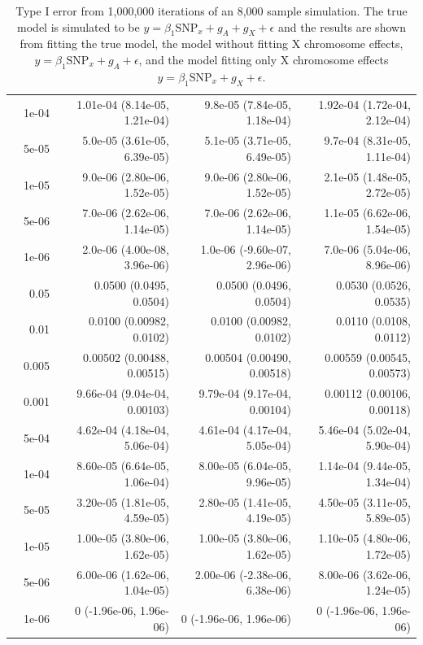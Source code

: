 \documentclass[11pt]{article} %
\newcommand{\snpX}{\mbox{SNP}_x}
\begin{document}
\begin{table}[ht]
\begin{tabular}{rrrrr}
   & 1e-04 & 1.01e-04 (8.14e-05, 1.21e-04) & 9.8e-05 (7.84e-05, 1.18e-04) & 1.92e-04 (1.72e-04, 2.12e-04) \\ 
 & 5e-05 & 5.0e-05 (3.61e-05, 6.39e-05) & 5.1e-05 (3.71e-05, 6.49e-05) & 9.7e-04 (8.31e-05, 1.11e-04) \\ 
& 1e-05 & 9.0e-06 (2.80e-06, 1.52e-05) & 9.0e-06 (2.80e-06, 1.52e-05) & 2.1e-05 (1.48e-05, 2.72e-05) \\ 
 & 5e-06 & 7.0e-06 (2.62e-06, 1.14e-05) & 7.0e-06 (2.62e-06, 1.14e-05) & 1.1e-05  (6.62e-06, 1.54e-05) \\ 
  &  1e-06 & 2.0e-06 (4.00e-08, 3.96e-06) & 1.0e-06 (-9.60e-07, 2.96e-06) & 7.0e-06  (5.04e-06, 8.96e-06) \\ 
   \hline \hline
\parbox[t]{2mm}{}  & 0.05 & 0.0500 (0.0495, 0.0504) & 0.0500 (0.0496, 0.0504) & 0.0530 (0.0526, 0.0535) \\ 
 & 0.01 & 0.0100  (0.00982, 0.0102) & 0.0100 (0.00982, 0.0102) & 0.0110 (0.0108, 0.0112) \\ 
 & 0.005 & 0.00502  (0.00488, 0.00515) & 0.00504 (0.00490, 0.00518) & 0.00559 (0.00545, 0.00573) \\ 
 & 0.001 & 9.66e-04  (9.04e-04, 0.00103) & 9.79e-04 (9.17e-04, 0.00104) & 0.00112 (0.00106, 0.00118) \\ 
 & 5e-04 & 4.62e-04  (4.18e-04, 5.06e-04) & 4.61e-04  (4.17e-04, 5.05e-04) & 5.46e-04  (5.02e-04, 5.90e-04) \\ 
 & 1e-04 & 8.60e-05  (6.64e-05, 1.06e-04) & 8.00e-05  (6.04e-05, 9.96e-05) & 1.14e-04  (9.44e-05, 1.34e-04) \\ 
 & 5e-05 & 3.20e-05  (1.81e-05, 4.59e-05) & 2.80e-05  (1.41e-05, 4.19e-05) & 4.50e-05  (3.11e-05, 5.89e-05) \\ 
 & 1e-05 & 1.00e-05  (3.80e-06, 1.62e-05) & 1.00e-05 (3.80e-06, 1.62e-05) & 1.10e-05  (4.80e-06, 1.72e-05) \\ 
 & 5e-06 & 6.00e-06  (1.62e-06, 1.04e-05) & 2.00e-06  (-2.38e-06, 6.38e-06) & 8.00e-06  (3.62e-06, 1.24e-05) \\ 
 & 1e-06 & 0  (-1.96e-06, 1.96e-06) & 0 (-1.96e-06, 1.96e-06) & 0 (-1.96e-06, 1.96e-06) \\ 
   \hline

\end{tabular}
\caption{Type I error from 1,000,000 iterations of an 8,000 sample simulation. The true model is simulated to be $y=\beta_1 \snpX + g_A + g_X + \epsilon$ and the results are shown from fitting the true model, the model without fitting X chromosome effects, $y=\beta_1 \snpX + g_A + \epsilon$, and the model fitting only X chromosome effects $y=\beta_1 \snpX + g_X + \epsilon$. }\label{typeIerror}
\end{table} 
\end{document}
